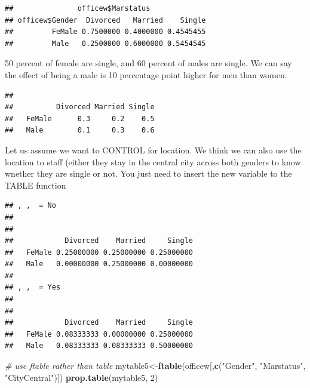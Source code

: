 \documentclass[
]{article}
\newenvironment{Shaded}{\begin{snugshade}}{\end{snugshade}}
\newcommand{\CommentTok}[1]{\textcolor[rgb]{0.56,0.35,0.01}{\textit{#1}}}
\newcommand{\DecValTok}[1]{\textcolor[rgb]{0.00,0.00,0.81}{#1}}
\newcommand{\FunctionTok}[1]{\textcolor[rgb]{0.13,0.29,0.53}{\textbf{#1}}}
\newcommand{\NormalTok}[1]{#1}
\newcommand{\OtherTok}[1]{\textcolor[rgb]{0.56,0.35,0.01}{#1}}
\newcommand{\SpecialCharTok}[1]{\textcolor[rgb]{0.81,0.36,0.00}{\textbf{#1}}}
\newcommand{\StringTok}[1]{\textcolor[rgb]{0.31,0.60,0.02}{#1}}
\begin{document}
\begin{verbatim}
##               officew$Marstatus
## officew$Gender  Divorced   Married    Single
##         FeMale 0.7500000 0.4000000 0.4545455
##         Male   0.2500000 0.6000000 0.5454545
\end{verbatim}

50 percent of female are single, and 60 percent of males are single. We
can say the effect of being a male is 10 percentage point higher for men
than women.

\begin{Shaded}
\end{Shaded}

\begin{verbatim}
##         
##          Divorced Married Single
##   FeMale      0.3     0.2    0.5
##   Male        0.1     0.3    0.6
\end{verbatim}

Let us assume we want to CONTROL for location. We think we can also use
the location to staff (either they stay in the central city across both
genders to know wnether they are single or not. You just need to insert
the new variable to the TABLE function

\begin{Shaded}
\end{Shaded}

\begin{verbatim}
## , ,  = No
## 
##         
##            Divorced    Married     Single
##   FeMale 0.25000000 0.25000000 0.25000000
##   Male   0.00000000 0.25000000 0.00000000
## 
## , ,  = Yes
## 
##         
##            Divorced    Married     Single
##   FeMale 0.08333333 0.00000000 0.25000000
##   Male   0.08333333 0.08333333 0.50000000
\end{verbatim}

\begin{Shaded}
\begin{Highlighting}[]
\CommentTok{\# use ftable rather than table}
\NormalTok{mytable5}\OtherTok{\textless{}{-}}\FunctionTok{ftable}\NormalTok{(officew[,}\FunctionTok{c}\NormalTok{(}\StringTok{"Gender"}\NormalTok{, }\StringTok{"Marstatus"}\NormalTok{, }\StringTok{"CityCentral"}\NormalTok{)])}
\FunctionTok{prop.table}\NormalTok{(mytable5, }\DecValTok{2}\NormalTok{)}
\end{Highlighting}
\end{Shaded}
\end{document}
